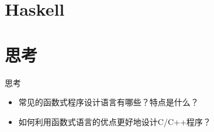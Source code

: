 \section{Haskell}


\section{思考}
\begin{frame}{思考}
\begin{itemize}
\item 常见的函数式程序设计语言有哪些？特点是什么？
\item 如何利用函数式语言的优点更好地设计C/C++程序？
\end{itemize}
\end{frame}


